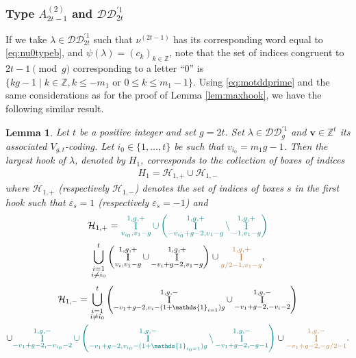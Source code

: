 \documentclass[11pt,letterpaper]{amsart}
\def\bbbz{\mathbb Z}
\def\cch{\mathcal H}
\def\ccdd{\mathcal {DD}}
\newtheorem{lm}[df]{Lemma}
\DeclareMathOperator{\I}{I}
\numberwithin{equation}{section}
\numberwithin{df}{section}
\begin{document}
\subsubsection{Type $A^{(2)}_{2t-1}$ and $\ccdd_{2t}^{'1}$}
If we take $\lambda\in\ccdd_{2t}^{'1}$ such that $\nu^{(2t-1)}$ has its corresponding word equal to \eqref{eq:nu0typeb}, and $\psi(\lambda)=(c_k)_{k\in\bbbz}$, note that the set of indices congruent to $2t-1\pmod{g}$ corresponding to a letter ``$0$'' is $\lbrace kg-1 \mid k\in\bbbz, k\leq -m_1 \text{ or } 0\leq k\leq m_1-1\rbrace$. Using \eqref{eq:motddprime} and the same considerations as for the proof of Lemma \ref{lem:maxhook}, we have the following similar result.
\begin{lm}\label{lem:maxhookddprime}
Let $t$ be a positive integer and set $g=2t$. Set $\lambda\in \ccdd_{g}^{'1}$ and $\mathbf{v}\in\bbbz^{t}$ its associated $V_{g,t}$-coding. Let $i_0\in\lbrace 1,\dots,t\rbrace$ be such that $v_{i_0}=m_1g-1$.
Then the largest hook of $\lambda$, denoted by $H_1$, corresponds to the collection of boxes of indices 
\begin{align*}
H_1=\cch_{1,+}\cup\cch_{1,-}
\end{align*}
where $\cch_{1,+}$ (respectively $\cch_{1,-}$) denotes the set of indices of boxes $s$ in the first hook such that $\varepsilon_s=1$ (respectively $\varepsilon_s=-1$) and
\begin{multline*}
\cch_{1,+}= \textcolor{teal}{\I_{v_{i_0},v_1-g}^{1,g,+}\cup \left(\I_{-v_{i_0}+g-2,v_1-g}^{1,g,+}\setminus \I_{-1,v_1-g}^{1,g,+}\right)}\\
\bigcup_{\substack{i=1\\i\neq i_0}}^{t}\left(\I_{v_i,v_1-g}^{1,g,+}\cup \I_{-v_i+g-2,v_1-g}^{1,g,+}\right)
\cup\textcolor{brown}{\I_{g/2-1,v_1-g}^{1,g,+}}
 ,
 \end{multline*}
 \begin{multline*}
\cch_{1,-}=   \displaystyle\bigcup_{\substack{i=1\\i\neq i_0}}^{t}\left(\I_{-v_1+g-2,v_i-(1+\mathds{1}_{i=1})g}^{1,g,-}\cup \I_{-v_1+g-2,-v_i-2}^{1,g,-}\right)\\\cup\textcolor{teal}{\I_{-v_1+g-2,-v_{i_0}-2}^{1,g,-}\cup\left(\I_{-v_1+g-2,v_{i_0}-(1+\mathds{1}_{i_0=1})g}^{1,g,-}\setminus \I_{-v_1+g-2,-g-1}^{1,g,-}\right)}\cup\textcolor{brown}{\I_{-v_1+g-2, -g/2-1}^{1,g,-}}.
\end{multline*}
\end{lm}
\end{document}
